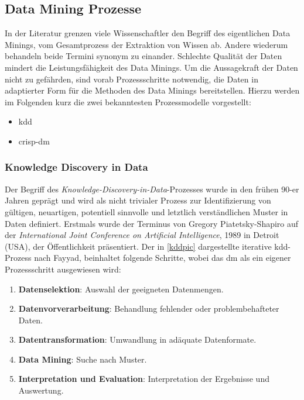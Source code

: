 \subsection{Data Mining Prozesse}
\label{prozdm}

In der Literatur grenzen viele Wissenschaftler den Begriff des eigentlichen Data Minings, vom Gesamtprozess der Extraktion von Wissen ab. Andere wiederum behandeln beide Termini synonym zu einander. Schlechte Qualität der Daten mindert die Leistungsfähigkeit des Data Minings. Um die Aussagekraft der Daten nicht zu gefährden, sind vorab Prozessschritte notwendig, die Daten in adaptierter Form für die Methoden des Data Minings bereitstellen. Hierzu werden im Folgenden kurz die zwei bekanntesten Prozessmodelle vorgestellt:

\begin{itemize}
\item \gls{kdd}
\item \gls{crisp-dm}
\end{itemize}

\subsubsection{Knowledge Discovery in Data}
\label{dmkdd}

Der Begriff des \textit{Knowledge-Discovery-in-Data}-Prozesses wurde in den frühen 90-er Jahren geprägt und wird als \glqq nicht trivialer Prozess zur Identifizierung von gültigen, neuartigen, potentiell sinnvolle und letztlich verständlichen Muster in Daten\grqq{} definiert. Erstmals wurde der Terminus von Gregory Piatetsky-Shapiro auf der \textit{International Joint Conference on Artificial Intelligence}, 1989 in Detroit (USA), der Öffentlichkeit präsentiert. Der in \vref{kddpic} dargestellte iterative \gls{kdd}-Prozess nach Fayyad, beinhaltet folgende Schritte, wobei das \gls{dm} als ein eigener Prozessschritt ausgewiesen wird:

\begin{enumerate}

\item \textbf{Datenselektion}: Auswahl der geeigneten Datenmengen.
\item \textbf{Datenvorverarbeitung}: Behandlung fehlender oder problembehafteter Daten.
\item \textbf{Datentransformation}: Umwandlung in adäquate Datenformate.
\item \textbf{Data Mining}: Suche nach Muster.
\item \textbf{Interpretation und Evaluation}: Interpretation der Ergebnisse und Auswertung.

\end{enumerate}

